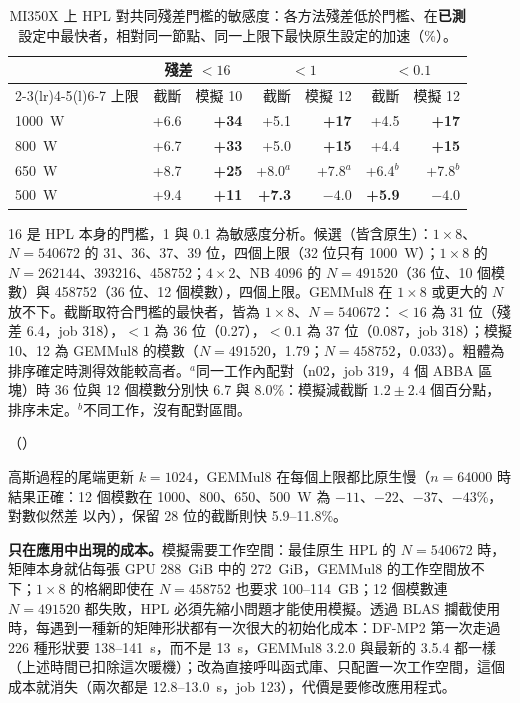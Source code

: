 \begin{table}[tbp]
\centering
\caption[MI350X 上 HPL 對共同殘差門檻的敏感度]{MI350X 上 HPL 對共同殘差門檻的敏感度：各方法殘差低於門檻、在\textbf{已測}設定中最快者，相對同一節點、同一上限下最快原生設定的加速（\%）。}\label{tab:mi-hplthr}
\small
\begin{tabular}{@{}lrrrrrr@{}}
\toprule
& \multicolumn{2}{c}{殘差 $<16$} & \multicolumn{2}{c}{$<1$} & \multicolumn{2}{c}{$<0.1$} \\
\cmidrule(lr){2-3}\cmidrule(lr){4-5}\cmidrule(l){6-7}
上限 & 截斷 & 模擬 10 & 截斷 & 模擬 12 & 截斷 & 模擬 12 \\
\midrule
1000~W & +6.6 & \textbf{+34} & +5.1 & \textbf{+17} & +4.5 & \textbf{+17} \\
800~W & +6.7 & \textbf{+33} & +5.0 & \textbf{+15} & +4.4 & \textbf{+15} \\
650~W & +8.7 & \textbf{+25} & +8.0$^{a}$ & +7.8$^{a}$ & +6.4$^{b}$ & +7.8$^{b}$ \\
500~W & +9.4 & \textbf{+11} & \textbf{+7.3} & $-4.0$ & \textbf{+5.9} & $-4.0$ \\
\bottomrule
\end{tabular}
\begin{tablenote}16 是 HPL 本身的門檻，1 與 0.1 為敏感度分析。候選（皆含原生）：$1\times8$、$N=540672$ 的 31、36、37、39 位，四個上限（32 位只有 1000~W）；$1\times8$ 的 $N=262144$、393216、458752；$4\times2$、NB 4096 的 $N=491520$（36 位、10 個模數）與 458752（36 位、12 個模數），四個上限。GEMMul8 在 $1\times8$ 或更大的 $N$ 放不下。截斷取符合門檻的最快者，皆為 $1\times8$、$N=540672$：$<16$ 為 31 位（殘差 6.4，job 318），$<1$ 為 36 位（0.27），$<0.1$ 為 37 位（0.087，job 318）；模擬 10、12 為 GEMMul8 的模數（$N=491520$，1.79；$N=458752$，0.033）。粗體為排序確定時測得效能較高者。$^{a}$同一工作內配對（n02，job 319，4 個 ABBA 區塊）時 36 位與 12 個模數分別快 6.7 與 8.0\%：模擬減截斷 $1.2\pm2.4$ 個百分點，排序未定。$^{b}$不同工作，沒有配對區間。\end{tablenote}
\begin{figsource}（）\end{figsource}
\end{table}

高斯過程的尾端更新 $k=1024$，GEMMul8 在每個上限都比原生慢（$n=64000$ 時結果正確：12 個模數在 1000、800、650、500~W 為 $-11$、$-22$、$-37$、$-43$\%，對數似然差  以內），保留 28 位的截斷則快 5.9–11.8\%。

\textbf{只在應用中出現的成本。}模擬需要工作空間：最佳原生 HPL 的 $N=540672$ 時，矩陣本身就佔每張 GPU 288~GiB 中的 272~GiB，GEMMul8 的工作空間放不下；$1\times8$ 的格網即使在 $N=458752$ 也要求 100–114~GB；12 個模數連 $N=491520$ 都失敗，HPL 必須先縮小問題才能使用模擬。透過 BLAS 攔截使用時，每遇到一種新的矩陣形狀都有一次很大的初始化成本：DF-MP2 第一次走過 226 種形狀要 138–141~s，而不是 13~s，GEMMul8 3.2.0 與最新的 3.5.4 都一樣（上述時間已扣除這次暖機）；改為直接呼叫函式庫、只配置一次工作空間，這個成本就消失（兩次都是 12.8–13.0~s，job 123），代價是要修改應用程式。

